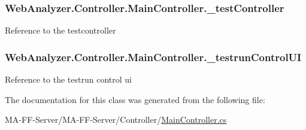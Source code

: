 \subsubsection[{\+\_\+test\+Controller}]{ Web\+Analyzer.\+Controller.\+Main\+Controller.\+\_\+test\+Controller\hspace{0.3cm}{\ttfamily [private]}}\label{class_web_analyzer_1_1_controller_1_1_main_controller_a89f0064ffc8bd59de5df9e610fc765f1}


Reference to the testcontroller 

\hypertarget{class_web_analyzer_1_1_controller_1_1_main_controller_a8acee18d61ec9490f689cf2492c56bc0}{}
\subsubsection[{\+\_\+testrun\+Control\+U\+I}]{ Web\+Analyzer.\+Controller.\+Main\+Controller.\+\_\+testrun\+Control\+U\+I\hspace{0.3cm}{\ttfamily [private]}}\label{class_web_analyzer_1_1_controller_1_1_main_controller_a8acee18d61ec9490f689cf2492c56bc0}


Reference to the testrun control ui 



The documentation for this class was generated from the following file\+:\begin{DoxyCompactItemize}
\item 
M\+A-\/\+F\+F-\/\+Server/\+M\+A-\/\+F\+F-\/\+Server/\+Controller/\hyperlink{_main_controller_8cs}{Main\+Controller.\+cs}\end{DoxyCompactItemize}
